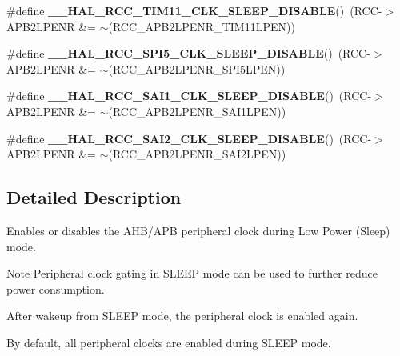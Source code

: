\begin{DoxyCompactItemize}
\item 
\mbox{\label{group___r_c_c_ex___peripheral___clock___sleep___enable___disable_gaf9c48fd8cd99db0e44d5427afe10c383}} 
\#define {\bfseries \+\_\+\+\_\+\+H\+A\+L\+\_\+\+R\+C\+C\+\_\+\+T\+I\+M11\+\_\+\+C\+L\+K\+\_\+\+S\+L\+E\+E\+P\+\_\+\+D\+I\+S\+A\+B\+LE}()~(R\+CC-\/$>$A\+P\+B2\+L\+P\+E\+NR \&= $\sim$(R\+C\+C\+\_\+\+A\+P\+B2\+L\+P\+E\+N\+R\+\_\+\+T\+I\+M11\+L\+P\+EN))
\item 
\mbox{\label{group___r_c_c_ex___peripheral___clock___sleep___enable___disable_ga282b97b01275b2926059e1a9469c3aef}} 
\#define {\bfseries \+\_\+\+\_\+\+H\+A\+L\+\_\+\+R\+C\+C\+\_\+\+S\+P\+I5\+\_\+\+C\+L\+K\+\_\+\+S\+L\+E\+E\+P\+\_\+\+D\+I\+S\+A\+B\+LE}()~(R\+CC-\/$>$A\+P\+B2\+L\+P\+E\+NR \&= $\sim$(R\+C\+C\+\_\+\+A\+P\+B2\+L\+P\+E\+N\+R\+\_\+\+S\+P\+I5\+L\+P\+EN))
\item 
\mbox{\label{group___r_c_c_ex___peripheral___clock___sleep___enable___disable_ga443ab84b0451a65d63416c0b8750a238}} 
\#define {\bfseries \+\_\+\+\_\+\+H\+A\+L\+\_\+\+R\+C\+C\+\_\+\+S\+A\+I1\+\_\+\+C\+L\+K\+\_\+\+S\+L\+E\+E\+P\+\_\+\+D\+I\+S\+A\+B\+LE}()~(R\+CC-\/$>$A\+P\+B2\+L\+P\+E\+NR \&= $\sim$(R\+C\+C\+\_\+\+A\+P\+B2\+L\+P\+E\+N\+R\+\_\+\+S\+A\+I1\+L\+P\+EN))
\item 
\mbox{\label{group___r_c_c_ex___peripheral___clock___sleep___enable___disable_ga5e39d751b1846122c50ff1058f93737c}} 
\#define {\bfseries \+\_\+\+\_\+\+H\+A\+L\+\_\+\+R\+C\+C\+\_\+\+S\+A\+I2\+\_\+\+C\+L\+K\+\_\+\+S\+L\+E\+E\+P\+\_\+\+D\+I\+S\+A\+B\+LE}()~(R\+CC-\/$>$A\+P\+B2\+L\+P\+E\+NR \&= $\sim$(R\+C\+C\+\_\+\+A\+P\+B2\+L\+P\+E\+N\+R\+\_\+\+S\+A\+I2\+L\+P\+EN))
\end{DoxyCompactItemize}


\subsection{Detailed Description}
Enables or disables the A\+H\+B/\+A\+PB peripheral clock during Low Power (Sleep) mode. 

\begin{DoxyNote}{Note}
Peripheral clock gating in S\+L\+E\+EP mode can be used to further reduce power consumption. 

After wakeup from S\+L\+E\+EP mode, the peripheral clock is enabled again. 

By default, all peripheral clocks are enabled during S\+L\+E\+EP mode. 
\end{DoxyNote}


